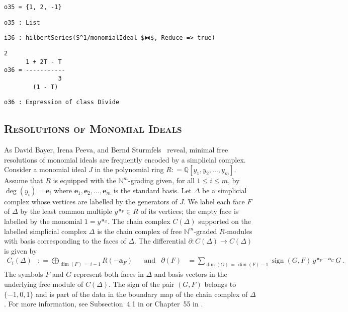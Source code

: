\documentclass[12pt,leqno]{amsart}
\theoremstyle{definition}
\newcommand{\colequal}{\ensuremath{:\!=}}
\begin{document}
\begin{lstlisting}[xleftmargin=10pt, aboveskip=1.5pt, belowskip=1.5pt]
o35 = {1, 2, -1}
\end{lstlisting}
\begin{lstlisting}[xleftmargin=10pt, aboveskip=1.5pt, belowskip=1.5pt]
o35 : List
\end{lstlisting}
\begin{lstlisting}[xleftmargin=10pt, aboveskip=1.5pt, belowskip=1.5pt]
i36 : hilbertSeries(S^1/monomialIdeal $⧓$, Reduce => true)
\end{lstlisting}
\begin{lstlisting}[xleftmargin=10pt, lineskip=-10pt, aboveskip=4pt, belowskip=1pt]
                2
      1 + 2T - T
o36 = -----------
               3
        (1 - T)
\end{lstlisting}
\begin{lstlisting}[xleftmargin=10pt, aboveskip=1.5pt, belowskip=-5.0pt]
o36 : Expression of class Divide
\end{lstlisting}


\subsection*{\scshape\mdseries Resolutions of Monomial Ideals}

As David Bayer, Irena Peeva, and Bernd Sturmfels~\cite{BPS} reveal, minimal
free resolutions of monomial ideals are frequently encoded by a simplicial
complex.  Consider a monomial ideal $J$ in the polynomial ring
$R \colequal \mathbb{Q}[y_1, y_2, \dotsc, y_m]$.  Assume that $R$ is equipped
with the $\mathbb{N}^{m}$-grading given, for all $1 \leqslant i \leqslant m$,
by $\deg(y_i) = \textbf{e}_i$ where
$\textbf{e}_1, \textbf{e}_2, \dotsc, \textbf{e}_m$ is the standard basis.  Let
$\Delta$ be a simplicial complex whose vertices are labelled by the generators
of $J$.  We label each face $F$ of $\Delta$ by the least common multiple
$y^{\,\textbf{a}_{\!F}} \in R$ of its vertices; the empty face is labelled by
the monomial $1 = y^{\,\textbf{a}_{\!\varnothing}}$.  The chain complex
$C(\Delta)$ supported on the labelled simplicial complex $\Delta$ is the chain
complex of free $\mathbb{N}^m$-graded $R$-modules with basis corresponding to
the faces of $\Delta$.  The differential
$\partial \colon\! C(\Delta) \to C(\Delta)$ is given by
\begin{align*}
  C_i(\Delta)
  &\colequal \bigoplus_{\dim(F) \,=\, i-1} R(-\textbf{a}_F) 
  & & \text{and}
  &\partial(F)
  &= \sum_{\dim(G) \,=\, \dim(F)-1} \operatorname{sign}(G,F) \,
    y^{\,\textbf{a}_{\!F} - \textbf{a}_{\!G}} \, G \, .
\end{align*}
The symbols $F$ and $G$ represent both faces in $\Delta$ and basis vectors in
the underlying free module of $C(\Delta)$.  The sign of the pair $(G,F)$
belongs to $\{-1,0,1\}$ and is part of the data in the boundary map of the
chain complex of $\Delta$.  For more information, see Subsection~4.1 in
\cite{MS} or Chapter~55 in \cite{Peeva}.
\end{document}
